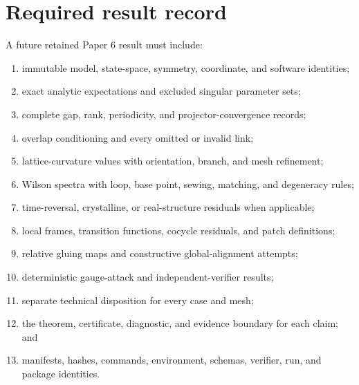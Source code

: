 \documentclass[11pt]{article}
\begin{document}
\section{Required result record}
A future retained Paper 6 result must include:
\begin{enumerate}
 \item immutable model, state-space, symmetry, coordinate, and software identities;
 \item exact analytic expectations and excluded singular parameter sets;
 \item complete gap, rank, periodicity, and projector-convergence records;
 \item overlap conditioning and every omitted or invalid link;
 \item lattice-curvature values with orientation, branch, and mesh refinement;
 \item Wilson spectra with loop, base point, sewing, matching, and degeneracy rules;
 \item time-reversal, crystalline, or real-structure residuals when applicable;
 \item local frames, transition functions, cocycle residuals, and patch definitions;
 \item relative gluing maps and constructive global-alignment attempts;
 \item deterministic gauge-attack and independent-verifier results;
 \item separate technical disposition for every case and mesh;
 \item the theorem, certificate, diagnostic, and evidence boundary for each claim; and
 \item manifests, hashes, commands, environment, schemas, verifier, run, and package identities.
\end{enumerate}



\end{document}
